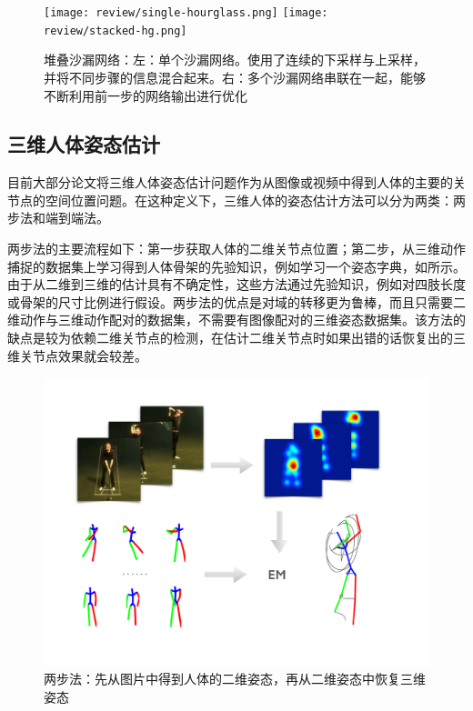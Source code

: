 \begin{refsection}
\begin{figure}[ht]
    \texttt{[image: review/single-hourglass.png]}
    \texttt{[image: review/stacked-hg.png]}
    \caption{堆叠沙漏网络\autocite{newell2016stacked}：左：单个沙漏网络。使用了连续的下采样与上采样，并将不同步骤的信息混合起来。右：多个沙漏网络串联在一起，能够不断利用前一步的网络输出进行优化}\label{fig:hourglass}
\end{figure}


\subsection{三维人体姿态估计}
目前大部分论文将三维人体姿态估计问题作为从图像或视频中得到人体的主要的关节点的空间位置问题。在这种定义下，三维人体的姿态估计方法可以分为两类：两步法和端到端法。

两步法的主要流程如下：第一步获取人体的二维关节点位置；第二步，从三维动作捕捉的数据集上学习得到人体骨架的先验知识，例如学习一个姿态字典\autocite{zhou2015sparse}，如所示。由于从二维到三维的估计具有不确定性，这些方法通过先验知识，例如对四肢长度或骨架的尺寸比例进行假设。两步法的优点是对域的转移更为鲁棒，而且只需要二维动作与三维动作配对的数据集，不需要有图像配对的三维姿态数据集。该方法的缺点是较为依赖二维关节点的检测，在估计二维关节点时如果出错的话恢复出的三维关节点效果就会较差。

\begin{figure}[ht]
    \centering
    \includegraphics[width=0.4\linewidth]{figures/overview.pdf}
    \caption{两步法\autocite{zhou2015sparse}：先从图片中得到人体的二维姿态，再从二维姿态中恢复三维姿态}\label{fig:twostep}
\end{figure}


\end{refsection}
